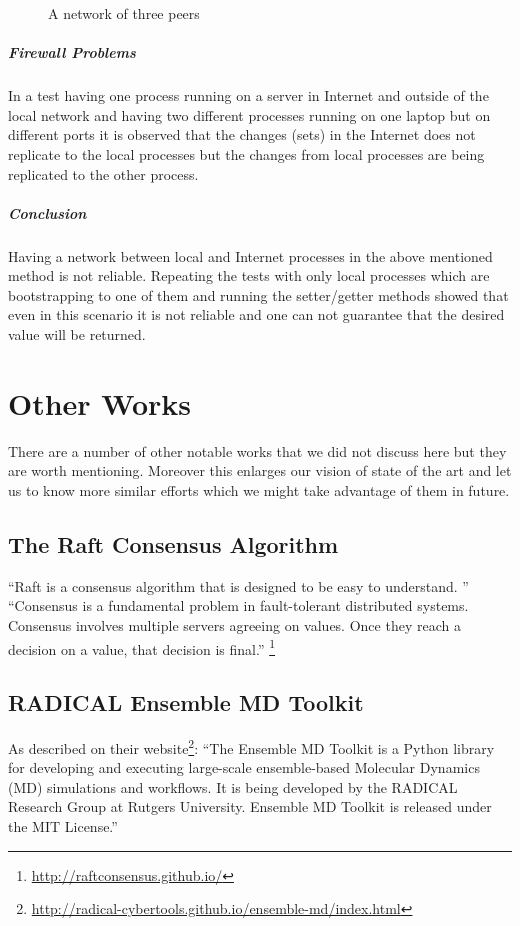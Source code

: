 \begin{figure}
\centering
{}
\caption{A network of three peers}
\label{fig:threepeers}
\end{figure}


\subparagraph{Firewall Problems}
In a test having one process running on a server in Internet and outside of the local network and having two
different processes running on one laptop but on different ports it is observed that the changes (sets) in the
Internet does not replicate to the local processes but the changes from local processes are being replicated to the other process.

\subparagraph{Conclusion}
Having a network between local and Internet processes in the above mentioned method is not reliable. 
Repeating the tests with only local processes which are bootstrapping to one of them and running the setter/getter
methods showed that even in this scenario it is not reliable and one can not guarantee that the desired value will be returned.

\section{Other Works}
There are a number of other notable works that we did not discuss here but they are worth mentioning.
Moreover this enlarges our vision of state of the art and let us to know more similar efforts 
which we might take advantage of them in future.

\subsection{The Raft Consensus Algorithm}
``Raft\cite{ongaro2014search} is a consensus algorithm that is designed to be easy to understand. ''
``Consensus is a fundamental problem in fault-tolerant distributed systems.
Consensus involves multiple servers agreeing on values. Once they reach a decision on a value, that decision is final.''
\footnote{\url{http://raftconsensus.github.io/}}

\subsection{RADICAL Ensemble MD Toolkit}
As described on their website\footnote{\url{http://radical-cybertools.github.io/ensemble-md/index.html}}:
``The Ensemble MD Toolkit is a Python library for developing and executing large-scale ensemble-based
Molecular Dynamics (MD) simulations and workflows. It is being developed by the RADICAL Research
Group at Rutgers University. Ensemble MD Toolkit is released under the MIT License.''

